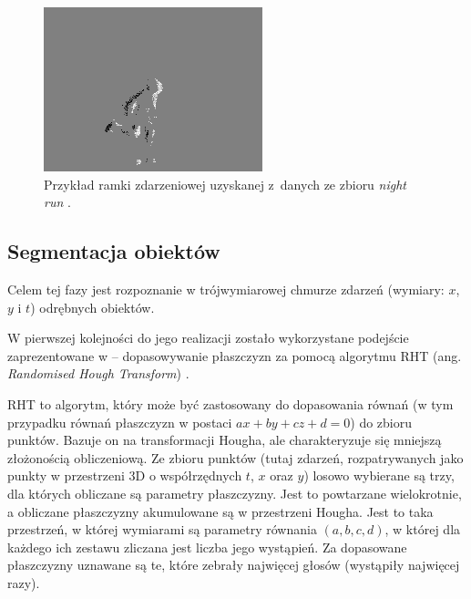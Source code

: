 \begin{figure}
    \centering
    \includegraphics[width=0.4\linewidth]{images/filtered_run3.png}
    \caption{Przykład ramki zdarzeniowej uzyskanej z~danych ze zbioru \textit{night run} \cite{night_run}.}
    \label{fig:frame_example}
\end{figure}


\subsection{Segmentacja obiektów}

Celem tej fazy jest rozpoznanie w trójwymiarowej chmurze zdarzeń (wymiary: $x$, $y$ i $t$) odrębnych obiektów.

\vspace{11px}

W pierwszej kolejności do jego realizacji zostało wykorzystane podejście zaprezentowane w \cite{night_obstacle} -- dopasowywanie płaszczyzn za pomocą algorytmu RHT (ang. \textit{Randomised Hough Transform}) \cite{RHT}.

RHT to algorytm, który może być zastosowany do dopasowania równań (w tym przypadku równań płaszczyzn w postaci $ax + by + cz + d = 0$) do zbioru punktów. Bazuje on na transformacji Hougha, ale charakteryzuje się mniejszą złożonością obliczeniową. Ze zbioru punktów (tutaj zdarzeń, rozpatrywanych jako punkty w przestrzeni 3D o współrzędnych $t$, $x$ oraz $y$) losowo wybierane są trzy, dla których obliczane są parametry płaszczyzny. Jest to powtarzane wielokrotnie, a obliczane płaszczyzny akumulowane są w przestrzeni Hougha. Jest to taka przestrzeń, w której wymiarami są parametry równania $(a, b, c, d)$, w której dla każdego ich zestawu zliczana jest liczba jego wystąpień.
Za dopasowane płaszczyzny uznawane są te, które zebrały najwięcej głosów (wystąpiły najwięcej razy).

